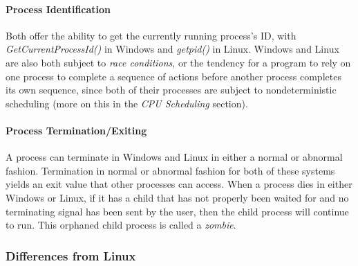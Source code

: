 \documentclass[letterpaper,10pt,titlepage]{article}
\begin{document}
\paragraph{Process Identification}
Both offer the ability to get the currently running process's ID, with \emph{GetCurrentProcessId()} in Windows and \emph{getpid()} in Linux. Windows and Linux are also both subject to \emph{race conditions}, or the tendency for a program to rely on one process to complete a sequence of actions before another process completes its own sequence, since both of their processes are subject to nondeterministic scheduling (more on this in the \emph{CPU Scheduling} section).
\paragraph{Process Termination/Exiting}
A process can terminate in Windows and Linux in either a normal or abnormal fashion. Termination in normal or abnormal fashion for both of these systems yields an exit value that other processes can access. When a process dies in either Windows or Linux, if it has a child that has not properly been waited for and no terminating signal has been sent by the user, then the child process will continue to run. This orphaned child process is called a \emph{zombie}. 
\subsubsection{Differences from Linux}
\end{document}
